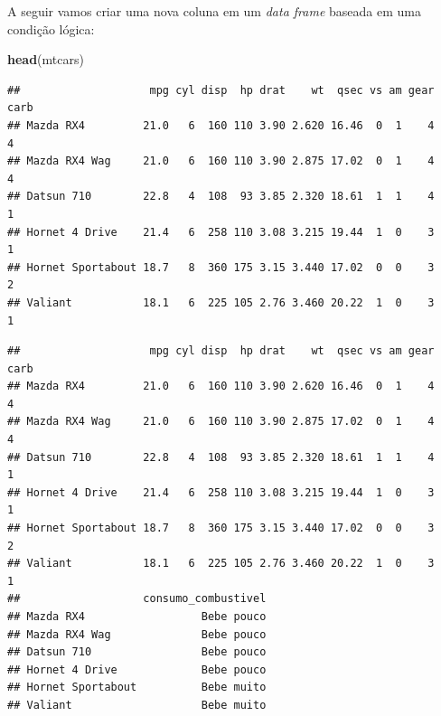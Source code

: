 \documentclass[
]{book}
\newenvironment{Shaded}{\begin{snugshade}}{\end{snugshade}}
\newcommand{\CommentTok}[1]{\textcolor[rgb]{0.56,0.35,0.01}{\textit{#1}}}
\newcommand{\DecValTok}[1]{\textcolor[rgb]{0.00,0.00,0.81}{#1}}
\newcommand{\KeywordTok}[1]{\textcolor[rgb]{0.13,0.29,0.53}{\textbf{#1}}}
\newcommand{\NormalTok}[1]{#1}
\newcommand{\OperatorTok}[1]{\textcolor[rgb]{0.81,0.36,0.00}{\textbf{#1}}}
\newcommand{\StringTok}[1]{\textcolor[rgb]{0.31,0.60,0.02}{#1}}
\begin{document}
A seguir vamos criar uma nova coluna em um \emph{data frame} baseada em
uma condição lógica:

\begin{Shaded}
\begin{Highlighting}[]
\KeywordTok{head}\NormalTok{(mtcars)}
\end{Highlighting}
\end{Shaded}

\begin{verbatim}
##                    mpg cyl disp  hp drat    wt  qsec vs am gear carb
## Mazda RX4         21.0   6  160 110 3.90 2.620 16.46  0  1    4    4
## Mazda RX4 Wag     21.0   6  160 110 3.90 2.875 17.02  0  1    4    4
## Datsun 710        22.8   4  108  93 3.85 2.320 18.61  1  1    4    1
## Hornet 4 Drive    21.4   6  258 110 3.08 3.215 19.44  1  0    3    1
## Hornet Sportabout 18.7   8  360 175 3.15 3.440 17.02  0  0    3    2
## Valiant           18.1   6  225 105 2.76 3.460 20.22  1  0    3    1
\end{verbatim}

\begin{Shaded}
\end{Shaded}

\begin{verbatim}
##                    mpg cyl disp  hp drat    wt  qsec vs am gear carb
## Mazda RX4         21.0   6  160 110 3.90 2.620 16.46  0  1    4    4
## Mazda RX4 Wag     21.0   6  160 110 3.90 2.875 17.02  0  1    4    4
## Datsun 710        22.8   4  108  93 3.85 2.320 18.61  1  1    4    1
## Hornet 4 Drive    21.4   6  258 110 3.08 3.215 19.44  1  0    3    1
## Hornet Sportabout 18.7   8  360 175 3.15 3.440 17.02  0  0    3    2
## Valiant           18.1   6  225 105 2.76 3.460 20.22  1  0    3    1
##                   consumo_combustivel
## Mazda RX4                  Bebe pouco
## Mazda RX4 Wag              Bebe pouco
## Datsun 710                 Bebe pouco
## Hornet 4 Drive             Bebe pouco
## Hornet Sportabout          Bebe muito
## Valiant                    Bebe muito
\end{verbatim}
\end{document}
